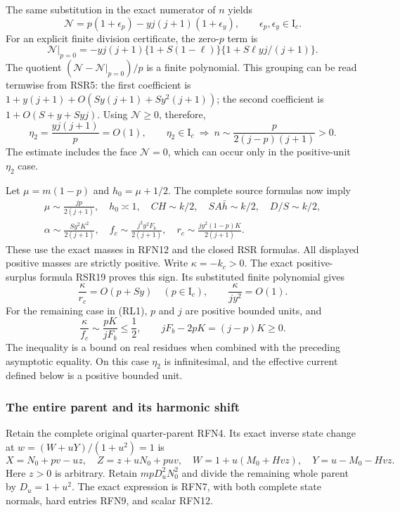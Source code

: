 The same substitution in the exact numerator of \(n\) yields
\[
 \mathcal N=p(1+\epsilon_p)
                -yj(j+1)(1+\epsilon_y),\qquad
 \epsilon_p,\epsilon_y\in\mathrm I_c.                  \tag{RL5}
\]
For an explicit finite division certificate, the zero-\(p\) term is
\[
 \mathcal N|_{p=0}
 =-yj(j+1)\{1+S(1-\ell)\}
             \{1+S\ell yj/(j+1)\}.
\]
The quotient \((\mathcal N-\mathcal N|_{p=0})/p\) is a
finite polynomial.  This grouping can be read termwise from RSR5:
the first
coefficient is \(1+y(j+1)+O(Sy(j+1)+Sy^2(j+1))\);
the second coefficient is \(1+O(S+y+Syj)\).
Using \(\mathcal N\geq0\), therefore,
\[
 \eta_2=\frac{yj(j+1)}p=O(1),\qquad
 \eta_2\in\mathrm I_c\ \Longrightarrow\
 n\sim\frac{p}{2(j-p)(j+1)}>0 .                        \tag{RL6}
\]
The estimate includes the face \(\mathcal N=0\), which can occur
only in the positive-unit \(\eta_2\) case.

Let \(\mu=m(1-p)\) and \(h_0=\mu+1/2\).
The complete source formulas now imply
\[
\begin{gathered}
 \mu\sim\frac{jp}{2(j+1)},\quad h_0\asymp1,\quad
 CH\sim k/2,\quad SA\bar h\sim k/2,\quad D/S\sim k/2,\\
 \alpha\sim\frac{Sy^2K^2}{2(j+1)},\quad
 f_c\sim\frac{j^2y^2F_b}{2(j+1)},\quad
 r_c\sim\frac{jy^2(1-p)K}{2(j+1)} .
\end{gathered}                                                   \tag{RL7}
\]
These use the exact masses in RFN12 and the closed RSR formulas.
All displayed positive masses are strictly positive.
Write \(\kappa=-k_c>0\).  The exact positive-surplus formula
RSR19 proves this sign.  Its substituted finite polynomial gives
\[
 \frac{\kappa}{r_c}=O(p+Sy)\quad(p\in\mathrm I_c),\qquad
 \frac{\kappa}{jy^2}=O(1).                              \tag{RL8}
\]
For the remaining case in (RL1), \(p\) and \(j\) are positive
bounded units, and
\[
 \frac{\kappa}{f_c}\sim\frac{pK}{jF_b}\leq\frac12,
 \qquad jF_b-2pK=(j-p)K\geq0.                          \tag{RL9}
\]
The inequality is a bound on real residues when combined with
the preceding asymptotic equality.  On this case \(\eta_2\) is
infinitesimal, and the effective current defined below is a
positive bounded unit.

\subsubsection*{The entire parent and its harmonic shift}

Retain the complete original quarter-parent RFN4.  Its exact inverse
state change at \(w=(W+uY)/(1+u^2)=1\) is
\[
 X=N_0+pv-uz,\quad Z=z+uN_0+puv,\quad
 W=1+u(M_0+Hvz),\quad Y=u-M_0-Hvz.                    \tag{RL10}
\]
Here \(z>0\) is arbitrary.  Retain \(mpD_u^2N_0^2\) and divide
the remaining whole parent by \(D_u=1+u^2\).
The exact expression is RFN7, with both complete state normals,
hard entries RFN9, and scalar RFN12.

